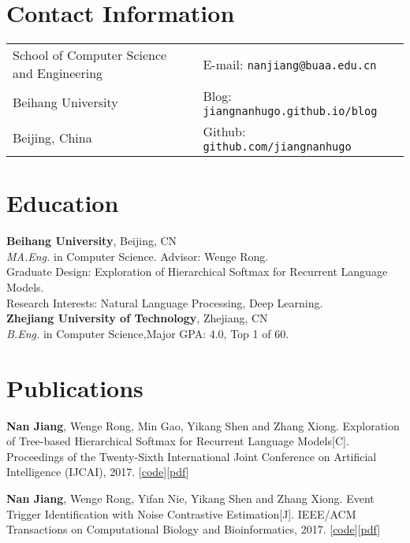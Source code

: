 \documentclass[margin,line]{resume}
\begin{document}

\begin{resume}
\section{Contact Information}
\begin{tabular}{@{}p{3in}p{3in}}
School of Computer Science and Engineering & { E-mail:}  {\tt nanjiang@buaa.edu.cn} \\
Beihang University                         & { Blog:} {\tt jiangnanhugo.github.io/blog} \\
Beijing, China                             & { Github:} {\tt github.com/jiangnanhugo} \\
\end{tabular}


\section{Education}
{\bf Beihang University}, Beijing,  CN\\
\emph{MA.Eng.} in Computer Science. Advisor: Wenge Rong.\\
Graduate Design: Exploration of Hierarchical Softmax for Recurrent Language Models. \\
Research Interests: Natural Language Processing, Deep Learning. \\

{\bf Zhejiang University of Technology}, Zhejiang, CN\\
\emph{B.Eng.} in Computer Science,\space Major GPA: 4.0, Top 1 of 60.


\section{Publications}
\textbf{Nan Jiang}, Wenge Rong, Min Gao, Yikang Shen and Zhang Xiong. Exploration of Tree-based Hierarchical Softmax for Recurrent Language Models[C]. Proceedings of the Twenty-Sixth International Joint Conference on Artificial Intelligence (IJCAI), 2017. [\href{https://github.com/jiangnanHugo/lmkit}{code}][\href{https://www.ijcai.org/proceedings/2017/0271.pdf}{pdf}]


\textbf{Nan Jiang}, Wenge Rong, Yifan Nie, Yikang Shen and Zhang Xiong. Event Trigger Identification with Noise Contrastive Estimation[J]. IEEE/ACM Transactions on Computational Biology and Bioinformatics, 2017. [\href{https://github.com/jiangnanHugo/mlee-nce}{code}][\href{https://github.com/jiangnanhugo/paper/blob/master/APBC2017/APBC2017.pdf}{pdf}]


\end{resume}
\end{document}
